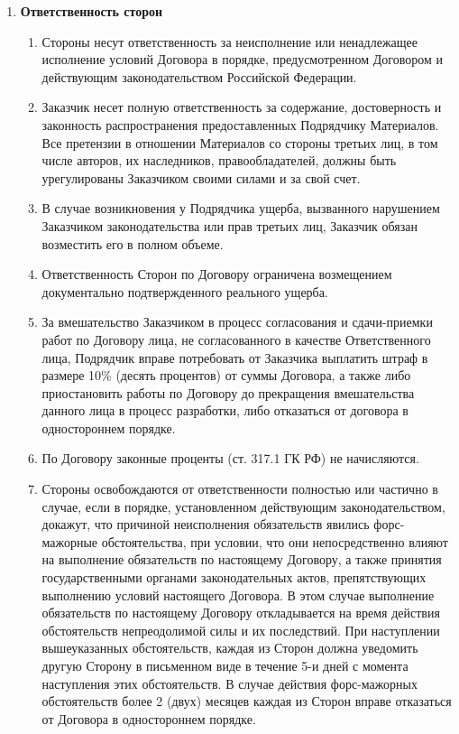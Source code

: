 \documentclass[14pt,a4paper]{article}
\begin{document}
\begin{enumerate}
	\item
	\begin{center}
	\textbf{Ответственность сторон}
	\end{center}
	\begin{enumerate}
		\item Стороны несут ответственность за неисполнение или ненадлежащее исполнение условий Договора в порядке, предусмотренном Договором и действующим законодательством Российской Федерации.
		
		\item Заказчик несет полную ответственность за содержание, достоверность и законность распространения предоставленных Подрядчику Материалов. Все претензии в отношении Материалов со стороны третьих лиц, в том числе авторов, их наследников, правообладателей, должны быть урегулированы Заказчиком своими силами и за свой счет.
		
		\item В случае возникновения у Подрядчика ущерба, вызванного нарушением Заказчиком законодательства или прав третьих лиц, Заказчик обязан возместить его в полном объеме.
		
		\item Ответственность Сторон по Договору ограничена возмещением документально подтвержденного реального ущерба.
		
		\item За вмешательство Заказчиком в процесс согласования и сдачи-приемки работ по Договору лица, не согласованного в качестве Ответственного лица, Подрядчик вправе потребовать от Заказчика выплатить штраф в размере 10\% (десять процентов) от суммы Договора, а также либо приостановить работы по Договору до прекращения вмешательства данного лица в процесс разработки, либо отказаться от договора в одностороннем порядке.
		
		\item По Договору законные проценты (ст. 317.1 ГК РФ) не начисляются.
		
		\item Стороны освобождаются от ответственности полностью или частично в случае, если в порядке, установленном действующим законодательством, докажут, что причиной неисполнения обязательств явились форс-мажорные обстоятельства, при условии, что они непосредственно влияют на выполнение обязательств по настоящему Договору, а также принятия государственными органами законодательных актов, препятствующих выполнению условий настоящего Договора. В этом случае выполнение обязательств по настоящему Договору откладывается на время действия обстоятельств непреодолимой силы и их
		последствий. При наступлении вышеуказанных обстоятельств, каждая из Сторон должна уведомить другую Сторону в письменном виде в течение 5-и дней с момента наступления этих обстоятельств. В случае действия форс-мажорных обстоятельств более 2 (двух) месяцев каждая из Сторон вправе отказаться от Договора в одностороннем порядке.
	\end{enumerate}


\end{enumerate}
\end{document}

